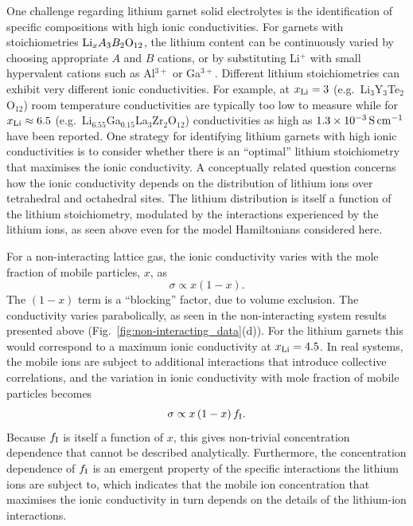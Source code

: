 \documentclass[aps,prb,twocolumn,superscriptaddress,reprint]{revtex4-1}
\newcommand{\xLi}{x_\m{Li}}
\begin{document}
One challenge regarding lithium garnet solid electrolytes is the identification of specific compositions with high ionic conductivities. For garnets with stoichiometries $\mathrm{Li}_xA_3B_2\mathrm{O}_{12}$, the lithium content can be continuously varied by choosing appropriate $A$ and $B$ cations, or by substituting Li$^+$ with small hypervalent cations such as Al$^{3+}$ or Ga$^{3+}$. Different lithium stoichiometries can exhibit very different ionic conductivities. For example, at $\xLi=3$ (e.g.\ Li$_3$Y$_3$Te$_2$O$_{12}$) room temperature conductivities are typically too low to measure\cite{OCallaghanEtAl_ChemMater2006,BachmanEtAl_ChemRev2016,ThangaduraiEtAl_JPhysChemLett2015} 
while for $\xLi\approx6.5$ (e.g.\ Li$_{6.55}$Ga$_{0.15}$La$_3$Zr$_2$O$_{12}$) conductivities as high as $1.3\times10^{-3}\,\mathrm{S}\,\mathrm{cm}^{-1}$ have been reported.\cite{Bernuy-LopezEtAl_ChemMater2014,RettenwanderEtAl_InorgChem2014} One strategy for identifying lithium garnets with high ionic conductivities is to consider whether there is an ``optimal'' lithium stoichiometry that maximises the ionic conductivity.\cite{MuruganEtAl_JElectrochemSoc2008,MuruganEtAl_Ionics2007,RamakumarEtAl_DaltonTrans2015,MiaraEtAl_ChemMater2013,XieEtAl_ChemMater2011,MuruganEtAl_MaterSciEngB2007,OCallaghanAndCussen_ChemComm2007,XuEtAl_PhysRevB2012,ChenEtAl_SciRep2017} A conceptually related question concerns how the ionic conductivity depends on the distribution of lithium ions over tetrahedral and octahedral sites.\cite{ChenEtAl_ChemMater2015,ThangaduraiEtAl_JAmCeramSoc2003,MuruganEtAl_MaterSciEngB2007,OCallaghanAndCussen_ChemComm2007} The lithium distribution is itself a function of the lithium stoichiometry, modulated by the interactions experienced by the lithium ions, as seen above even for the model Hamiltonians considered here.
 
For a non-interacting lattice gas, the ionic conductivity varies with the mole fraction of mobile particles, $x$, as
\begin{equation}
  \sigma \propto x \left(1-x\right).
\end{equation}
The $(1-x)$ term is a ``blocking'' factor, due to volume exclusion.\cite{Kutner_PhysLett1981} The conductivity varies parabolically, as seen in the non-interacting system results presented above (Fig.\ \ref{fig:non-interacting_data}(d)). For the lithium garnets this would correspond to a maximum ionic conductivity at $\xLi=4.5$. In real systems, the mobile ions are subject to additional interactions that introduce collective correlations, and the variation in ionic conductivity with mole fraction of mobile particles becomes
\begin{equation}
  \sigma \propto x \left(1-x\right)f_{\mathrm{I}}.
  \label{eqn:sigma_conc_dependence}
\end{equation}
Because $f_{\mathrm{I}}$ is itself a function of $x$, this gives non-trivial concentration dependence that cannot be described analytically. Furthermore, the concentration dependence of $f_{\mathrm{I}}$ is an emergent property of the specific interactions the lithium ions are subject to, which indicates that the mobile ion concentration that maximises the ionic conductivity in turn depends on the details of the lithium-ion interactions. 
\end{document}
